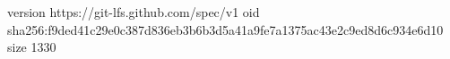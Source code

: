 version https://git-lfs.github.com/spec/v1
oid sha256:f9ded41c29e0c387d836eb3b6b3d5a41a9fe7a1375ac43e2c9ed8d6c934e6d10
size 1330
